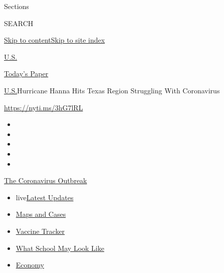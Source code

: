 Sections

SEARCH

\protect\hyperlink{site-content}{Skip to
content}\protect\hyperlink{site-index}{Skip to site index}

\href{https://www.nytimes.com/section/us}{U.S.}

\href{https://myaccount.nytimes.com/auth/login?response_type=cookie\&client_id=vi}{}

\href{https://www.nytimes.com/section/todayspaper}{Today's Paper}

\href{/section/us}{U.S.}\textbar{}Hurricane Hanna Hits Texas Region
Struggling With Coronavirus

\url{https://nyti.ms/3hG7lRL}

\begin{itemize}
\item
\item
\item
\item
\item
\end{itemize}

\href{https://www.nytimes.com/news-event/coronavirus?action=click\&pgtype=Article\&state=default\&region=TOP_BANNER\&context=storylines_menu}{The
Coronavirus Outbreak}

\begin{itemize}
\tightlist
\item
  live\href{https://www.nytimes.com/2020/08/01/world/coronavirus-covid-19.html?action=click\&pgtype=Article\&state=default\&region=TOP_BANNER\&context=storylines_menu}{Latest
  Updates}
\item
  \href{https://www.nytimes.com/interactive/2020/us/coronavirus-us-cases.html?action=click\&pgtype=Article\&state=default\&region=TOP_BANNER\&context=storylines_menu}{Maps
  and Cases}
\item
  \href{https://www.nytimes.com/interactive/2020/science/coronavirus-vaccine-tracker.html?action=click\&pgtype=Article\&state=default\&region=TOP_BANNER\&context=storylines_menu}{Vaccine
  Tracker}
\item
  \href{https://www.nytimes.com/interactive/2020/07/29/us/schools-reopening-coronavirus.html?action=click\&pgtype=Article\&state=default\&region=TOP_BANNER\&context=storylines_menu}{What
  School May Look Like}
\item
  \href{https://www.nytimes.com/live/2020/07/31/business/stock-market-today-coronavirus?action=click\&pgtype=Article\&state=default\&region=TOP_BANNER\&context=storylines_menu}{Economy}
\end{itemize}

